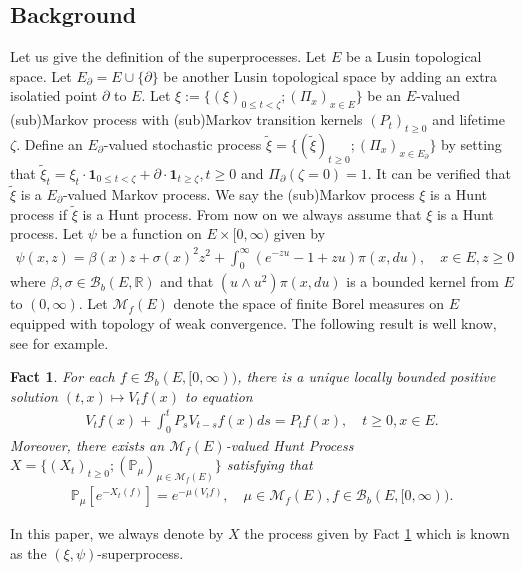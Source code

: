 \documentclass[12pt,a4paper]{amsart}
\numberwithin{equation}{section}
\theoremstyle{plain}
\newtheorem{fact}[thm]{Fact}
\theoremstyle{definition}
\theoremstyle{remark}
\begin{document}
\subsection{Background} 
\par
Let us give the definition of the superprocesses.
Let $E$ be a Lusin topological space. 
Let $E_\partial = E\cup\{\partial\} $ be another Lusin topological space by adding an extra isolatied point $\partial$ to $E$. 
Let $\xi:= \{(\xi)_{0\leq t < \zeta}; (\Pi_x)_{x\in E}\}$ be an $E$-valued (sub)Markov process with (sub)Markov transition kernels $(P_t)_{t\geq 0}$ and lifetime $\zeta$. 
Define an $E_\partial$-valued stochastic process $\tilde \xi = \{(\tilde \xi)_{t\geq 0} ; (\Pi_{x})_{x\in {E_\partial}}\} $ by setting that $\tilde \xi_t = \xi_t\cdot \mathbf 1_{0\leq t< \zeta} + \partial \cdot \mathbf 1_{t\geq \zeta}, t\geq 0$ and $\Pi_\partial (\zeta = 0) = 1$. 
It can be verified that $\tilde \xi$ is a $E_\partial$-valued Markov process. 
We say the (sub)Markov process $\xi$ is a Hunt process if $\tilde \xi$ is a Hunt process. 
From now on we always assume that $\xi$ is a Hunt process. 
Let $\psi$ be a function on $E \times [0,\infty)$ given by 
\begin{align} 
\psi(x,z) 
= \beta(x) z + \sigma(x)^2 z^2 + \int_0^\infty (e^{-zu} -1 + zu) \pi(x,du), 
\quad x\in E, z\geq 0 
\end{align} 
where $\beta, \sigma \in \mathcal B_b(E,\mathbb R)$ and that $(u \wedge u^2) \pi(x,du)$ is a bounded kernel from $E$ to $(0,\infty)$. 
Let $\mathcal M_f(E)$ denote the space of finite Borel measures on $E$ equipped with topology of weak convergence. 
The following result is well know, see \cite{Li2011MeasureValued} for example.
\begin{fact} \label{Fact:S!} 
For each $f \in \mathcal B_b(E, [0,\infty))$, there is a unique locally bounded positive solution $(t,x)\mapsto V_tf(x)$ to equation
\begin{align} 
V_tf(x) + \int_0^t P_{s}V_{t-s}f(x)ds 
= P_tf(x), \quad t\geq 0, x\in E. 
\end{align}
Moreover, there exists an $\mathcal M_f(E)$-valued Hunt Process $X =\{(X_t)_{t\geq 0}; (\mathbb P_\mu)_{\mu \in \mathcal M_f(E)}\}$ satisfying that  
\begin{align} 
\mathbb P_\mu[e^{- X_t(f)}]  
= e^{- \mu(V_tf)}, \quad \mu \in \mathcal M_f(E), 
f \in \mathcal B_b(E,[0,\infty)). 
\end{align}
\end{fact}
In this paper, we always denote by $X$ the process given by Fact \ref{Fact:S!} which is known as the $(\xi, \psi)$-superprocess.
\end{document}
